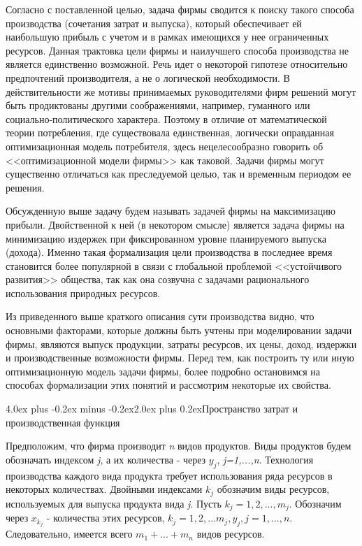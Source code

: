 \documentclass[12pt, 4paper]{book}
\makeatletter
\renewcommand{\section}{\@startsection{section}{1}{1pt}%
	{4.0ex plus -0.2ex minus -0.2ex}{2.0ex plus 0.2ex}{\centering\bf}}%
\makeatother
\begin{document}
{Согласно с поставленной целью, задача фирмы сводится к поиску такого способа производства (сочетания затрат и выпуска), который обеспечивает ей наибольшую прибыль с учетом и в рамках имеющихся у нее ограниченных ресурсов. Данная трактовка цели фирмы и наилучшего способа производства не является единственно возможной. Речь идет о некоторой гипотезе относительно предпочтений производителя, а не о логической необходимости. В действительности же мотивы принимаемых руководителями фирм решений могут быть продиктованы другими соображениями, например, гуманного или социально-политического характера. Поэтому в отличие от математической теории потребления, где существовала единственная, логически оправданная оптимизационная модель потребителя, здесь нецелесообразно говорить об <<оптимизационной модели фирмы>> как таковой. Задачи фирмы могут существенно отличаться как преследуемой целью, так и временным периодом ее решения. 
\par

Обсужденную выше задачу будем называть задачей фирмы на максимизацию прибыли. Двойственной к ней (в некотором смысле) является задача фирмы на минимизацию издержек при фиксированном уровне планируемого выпуска (дохода). Именно такая формализация цели производства в последнее время становится более популярной в связи с глобальной проблемой <<устойчивого развития>> общества, так как она созвучна с задачами рационального использования природных ресурсов. 
\par

Из приведенного выше краткого описания сути производства видно, что основными факторами, которые должны быть учтены при моделировании задачи фирмы, являются выпуск продукции, затраты ресурсов, их цены, доход, издержки и производственные возможности фирмы. Перед тем, как построить ту или иную оптимизационную модель задачи фирмы, более подробно остановимся на способах формализации этих понятий и рассмотрим некоторые их свойства. 
\newpage

\begin{center}
\section{Пространство затрат и производственная функция}
\end{center}
\par

Предположим, что фирма производит \textit{n} видов продуктов. Виды продуктов будем обозначать индексом \textit{j}, а их количества - через $y_j$, \textit{j=1,...,n}. Технология производства каждого вида продукта требует использования ряда ресурсов в некоторых количествах. Двойными индексами $k_j$ обозначим виды ресурсов, используемых для выпуска продукта вида \textit{j}. Пусть $k_j=1,2,...,m_j$. Обозначим через $x_{k_{j}}$ - количества этих ресурсов, $k_j=1,2,...m_j,y_j,j=1,...,n$. Следовательно, имеется всего $m_1+...+m_n$  видов ресурсов. 
\par

}
\end{document}

